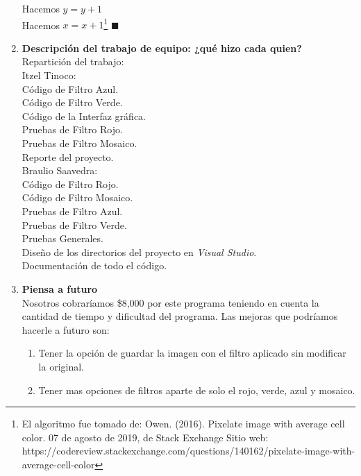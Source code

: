 \documentclass[12pt]{article}
\begin{document}
\begin{enumerate}
		\hspace*{1cm}Hacemos $y = y + 1$\\
	Hacemos $x = x + 1$\footnote{El algoritmo fue tomado de: Owen. (2016). Pixelate image with average cell color. 07 de agosto de 2019, de Stack Exchange Sitio web: https://codereview.stackexchange.com/questions/140162/pixelate-image-with-average-cell-color}
	$\blacksquare$
	\item \textbf{Descripción del trabajo de equipo: ¿qué hizo cada quien?}\\
	Repartición del trabajo:\\
	Itzel Tinoco:\\
			\hspace*{0.5cm} Código de Filtro Azul.\\
			\hspace*{0.5cm} Código de Filtro Verde.\\
			\hspace*{0.5cm} Código de la Interfaz gráfica.\\
			\hspace*{0.5cm} Pruebas de Filtro Rojo.\\
			\hspace*{0.5cm} Pruebas de Filtro Mosaico.\\			
			\hspace*{0.5cm} Reporte del proyecto.\\
	Braulio Saavedra:\\
			\hspace*{0.5cm} Código de Filtro Rojo.\\
			\hspace*{0.5cm} Código de Filtro Mosaico.\\
			\hspace*{0.5cm} Pruebas de Filtro Azul.\\
			\hspace*{0.5cm} Pruebas de Filtro Verde.\\
			\hspace*{0.5cm} Pruebas Generales.\\
			\hspace*{0.5cm} Diseño de los directorios del proyecto en {\em Visual Studio}.\\
			\hspace*{0.5cm} Documentación de todo el código.	
	\item \textbf{Piensa a futuro}\\
	Nosotros cobraríamos \$8,000 por este programa teniendo en cuenta la cantidad de tiempo y dificultad del programa.
	Las mejoras que podríamos hacerle a futuro son:
		\begin{enumerate}
		\item Tener la opción de guardar la imagen con el filtro aplicado sin modificar la original.
		\item Tener mas opciones de filtros aparte de solo el rojo, verde, azul y mosaico.
		\end{enumerate}
	\end{enumerate}
\end{document}
